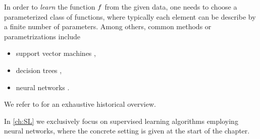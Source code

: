 In order to \emph{learn} the function $f$ from the given data, one needs to choose a parameterized class of functions, where typically each element can be describe by a finite number of parameters. Among others, common methods or parametrizations include
%
\begin{itemize}
\item support vector machines \cite{cortes1995support, scholkopf2005support},
\item decision trees \cite{morgan1963problems, Brei},
\item neural networks \cite{Turing,rosenblatt1958perceptron, minsky1969introduction}.
\end{itemize}
%
We refer to \cite{SCHMIDHUBER201585} for an exhaustive historical overview.

In \cref{ch:SL} we exclusively focus on supervised learning algorithms employing neural networks, where the concrete setting is given at the start of the chapter.
%
%
%
